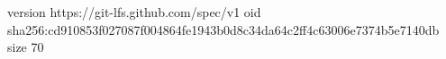 version https://git-lfs.github.com/spec/v1
oid sha256:cd910853f027087f004864fe1943b0d8c34da64c2ff4c63006e7374b5e7140db
size 70
